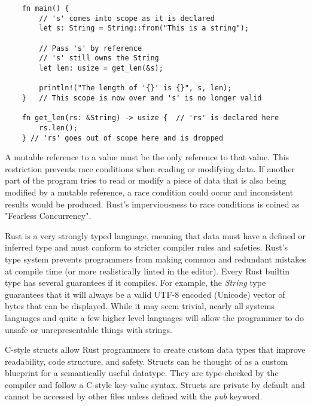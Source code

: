 \documentclass[12pt]{article}
\begin{document}
\singlespacing{}
\begin{verbatim}
    fn main() {
        // 's' comes into scope as it is declared
        let s: String = String::from("This is a string");

        // Pass 's' by reference
        // 's' still owns the String
        let len: usize = get_len(&s);

        println!("The length of '{}' is {}", s, len);
    }   // This scope is now over and 's' is no longer valid

    fn get_len(rs: &String) -> usize {  // 'rs' is declared here
        rs.len();
    } // 'rs' goes out of scope here and is dropped
\end{verbatim}
\doublespacing{}

A mutable reference to a value must be the only reference to that value. This
restriction prevents race conditions when reading or modifying data. If another
part of the program tries to read or modify a piece of data that is also being
modified by a mutable reference, a race condition could occur and inconsistent
results would be produced. Rust's imperviousness to race conditions is coined
as
"Fearless Concurrency". 


Rust is a very strongly typed language, meaning that data must have a defined
or inferred type and must conform to stricter compiler rules and safeties.
Rust's type system prevents programmers from making common and redundant
mistakes at compile time (or more realistically linted in the editor). Every
Rust builtin type has several guarantees if it compiles. For example, the
\textit{String} type guarantees that it will always be a valid UTF-8 encoded
(Unicode) vector of bytes that can be displayed. While it may seem trivial,
nearly all systems languages and quite a few higher level languages will allow
the programmer to do unsafe or unrepresentable things with strings.


C-style structs allow Rust programmers to create custom data types that improve
readability, code structure, and safety. Structs can be thought of as a custom
blueprint for a semantically useful datatype. They are type-checked by the
compiler and follow a C-style key-value syntax. Structs are private by default
and cannot be accessed by other files unless defined with the \textit{pub}
keyword.
\end{document}
